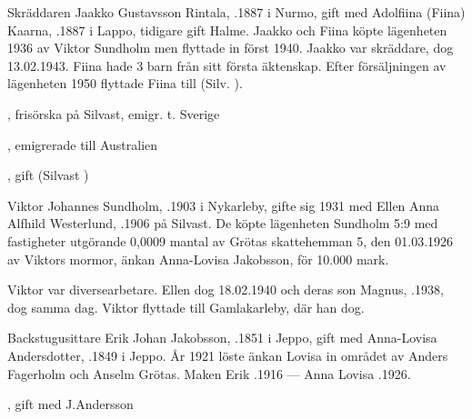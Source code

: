 Skräddaren Jaakko Gustavsson Rintala, .1887 i Nurmo, gift med Adolfiina (Fiina) Kaarna, .1887 i Lappo, tidigare gift Halme. Jaakko och Fiina  köpte lägenheten 1936 av Viktor Sundholm men flyttade in först 1940. Jaakko var skräddare, dog 13.02.1943.  Fiina hade 3 barn från sitt första äktenskap. Efter försäljningen av lägenheten 1950 flyttade Fiina till (Silv.     ).
\begin{jhchildren}
  \item {}, frisörska på Silvast, emigr. t. Sverige
  \item {}, emigrerade till Australien
  \item {}, gift (Silvast      )
\end{jhchildren}


Viktor Johannes Sundholm, .1903 i Nykarleby, gifte sig 1931 med Ellen Anna Alfhild Westerlund, .1906 på Silvast. De köpte lägenheten Sundholm 5:9 med fastigheter utgörande 0,0009 mantal av Grötas skattehemman 5, den 01.03.1926 av Viktors mormor, änkan Anna-Lovisa Jakobsson, för 10.000 mark.

Viktor var diversearbetare. Ellen dog 18.02.1940 och deras son Magnus, .1938, dog samma dag. Viktor flyttade till Gamlakarleby, där han dog.


Backstugusittare Erik Johan Jakobsson, .1851 i Jeppo, gift med Anna-Lovisa Andersdotter, .1849 i Jeppo. År 1921 löste änkan Lovisa in området av Anders Fagerholm och Anselm Grötas.
Maken Erik .1916  ---  Anna Lovisa .1926.
\begin{jhchildren}
  \item {}
  \item {}, gift med J.Andersson
  \item {}
  \item {}
  \item {}
\end{jhchildren}

